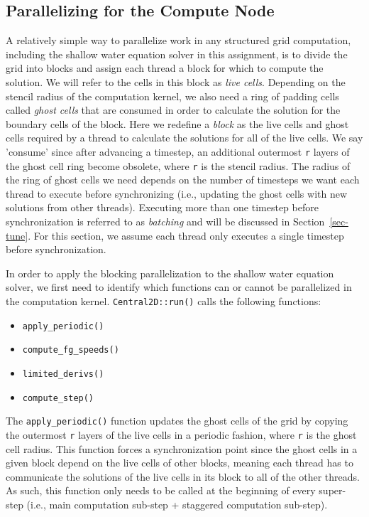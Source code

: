 
\subsection{Parallelizing for the Compute Node}
\label{sec-parallel-node}

A relatively simple way to parallelize work in any structured grid
computation, including the shallow water equation solver in this
assignment, is to divide the grid into blocks and assign each thread a
block for which to compute the solution. We will refer to the cells in
this block as \emph{live cells}. Depending on the stencil radius of the
computation kernel, we also need a ring of padding cells called
\emph{ghost cells} that are consumed in order to calculate the solution
for the boundary cells of the block. Here we redefine a \emph{block} as
the live cells and ghost cells required by a thread to calculate the
solutions for all of the live cells. We say 'consume' since after
advancing a timestep, an additional outermost \texttt{r} layers of the
ghost cell ring become obsolete, where \texttt{r} is the stencil
radius. The radius of the ring of ghost cells we need depends on the
number of timesteps we want each thread to execute before synchronizing
(i.e., updating the ghost cells with new solutions from other
threads). Executing more than one timestep before synchronization is
referred to as \emph{batching} and will be discussed in
Section~\ref{sec-tune}. For this section, we assume each thread only
executes a single timestep before synchronization.

In order to apply the blocking parallelization to the shallow water
equation solver, we first need to identify which functions can or cannot
be parallelized in the computation kernel. \texttt{Central2D::run()}
calls the following functions:

\begin{itemize}
  \item \texttt{apply\_periodic()}
  \item \texttt{compute\_fg\_speeds()}
  \item \texttt{limited\_derivs()}
  \item \texttt{compute\_step()}
\end{itemize}

The \texttt{apply\_periodic()} function updates the ghost cells of the
grid by copying the outermost \texttt{r} layers of the live cells
in a periodic fashion, where \texttt{r} is the ghost cell radius. This
function forces a synchronization point since the ghost cells in a given
block depend on the live cells of other blocks, meaning each thread has
to communicate the solutions of the live cells in its block to all of the
other threads. As such, this function only needs to be called at the
beginning of every super-step (i.e., main computation sub-step +
staggered computation sub-step).

